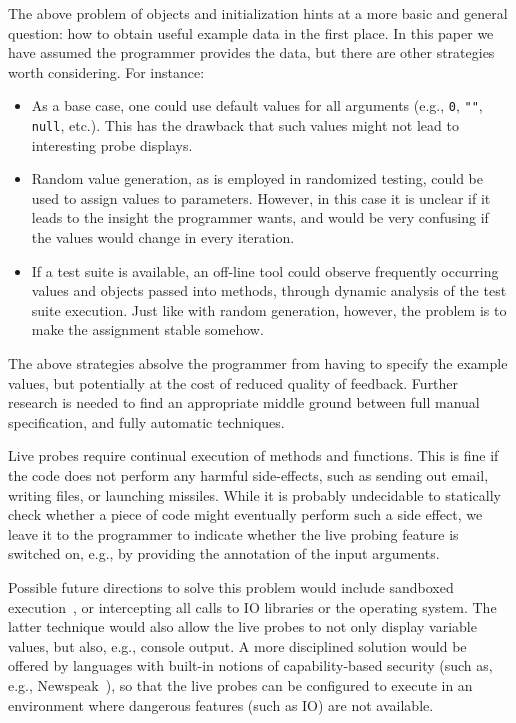 \documentclass[english,submission]{programming}
\begin{document}
The above problem of objects and initialization hints at a more basic and general question: how to obtain useful example data in the first place. In this paper we have assumed the programmer provides the data, but there are other strategies worth considering. For instance:
\begin{itemize}
  \item As a base case, one could use default values for all arguments (e.g., \lstinline{0}, \lstinline{""}, \lstinline{null}, etc.). This has the drawback that such values might not lead to interesting probe displays. 
  \item Random value generation, as is employed in randomized testing, could be used to assign values to parameters. However, in this case it is unclear if it leads to the insight the programmer wants, and would be very confusing if the values would change in every iteration.
  \item If a test suite is available, an off-line tool could observe frequently occurring values and objects passed into methods, through dynamic analysis of the test suite execution. Just like with random generation, however, the problem is to make the assignment stable somehow. 
\end{itemize}
The above strategies absolve the programmer from having to specify the example values, but potentially at the cost of reduced quality of feedback. Further research is needed to find an appropriate middle ground between full manual specification, and fully automatic techniques.

Live probes require continual execution of methods and functions. This is fine if the code does not perform any harmful side-effects, such as sending out email, writing files, or launching missiles. While it is probably undecidable to statically check whether a piece of code might eventually perform such a side effect, we leave it to the programmer to indicate whether the live probing feature is switched on, e.g., by providing the annotation of the input arguments. 

Possible future directions to solve this problem would include sandboxed execution~\cite{???}, or intercepting all calls to IO libraries or the operating system. The latter technique would also allow the live probes to not only display variable values, but also, e.g., console output. 
A more disciplined solution would be offered by languages with built-in notions of capability-based security (such as, e.g., Newspeak~\cite{Newspeak}), so that the live probes can be configured to execute in an environment where dangerous features (such as IO) are not available.  
\end{document}

